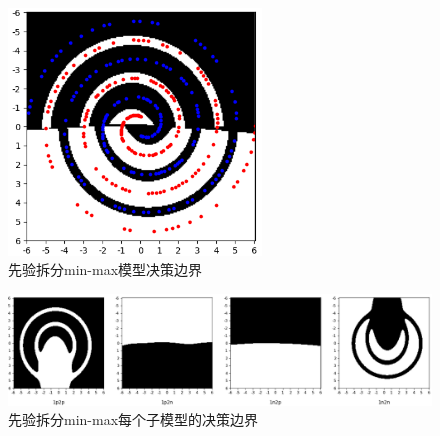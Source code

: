 \documentclass[12pt, a4paper, oneside]{ctexart}
\begin{document}
    \begin{figure}[htbp]
        \centering
        \includegraphics[width=0.6\textwidth]{figures/minmax_axis_boundary.png}
        \caption{先验拆分min-max模型决策边界}
        \label{Fig-minmax-axis-boundary}
    \end{figure}

    \begin{figure}[htbp]
        \centering
        \includegraphics[width=1.0\textwidth]{figures/minmax_axis_each_boundary.png}
        \caption{先验拆分min-max每个子模型的决策边界}
        \label{Fig-minmax-axis-each-boundary}
    \end{figure}
\end{document}
